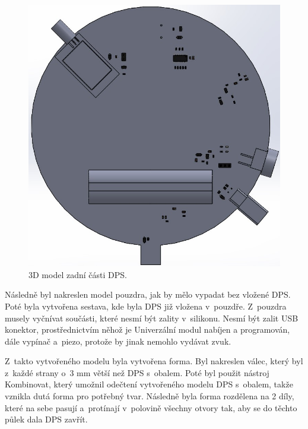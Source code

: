 \begin{figure}[!h]
  \begin{center}
    \includegraphics[scale=0.4]{obrazky/3D_model_zadni.jpg}
  \end{center}
  \caption[3D model zadní části DPS]{3D model zadní části DPS.}
\end{figure}

Následně byl nakreslen model pouzdra, jak by mělo vypadat bez vložené DPS. Poté byla vytvořena sestava, kde byla DPS již vložena v~pouzdře. Z~pouzdra musely vyčnívat součásti, které nesmí být 
zality v~silikonu. Nesmí být zalit USB konektor, prostřednictvím něhož je Univerzální modul nabíjen a programován, dále vypínač a~piezo, protože by jinak nemohlo vydávat zvuk. 

Z~takto vytvořeného modelu byla vytvořena forma. Byl nakreslen válec, který byl z~každé strany o~3 mm větší než DPS s~obalem. Poté byl použit nástroj Kombinovat, který umožnil odečtení vytvořeného 
modelu DPS s~obalem, takže vznikla dutá forma pro potřebný tvar. Následně byla forma rozdělena na 2 díly, které na sebe pasují a~protínají v~polovině všechny otvory tak, aby se do těchto půlek 
dala DPS zavřít.

